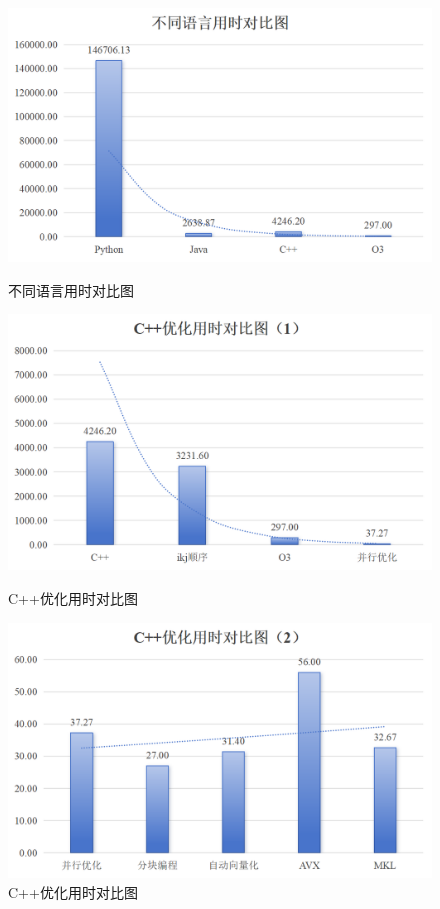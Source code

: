 \documentclass[a4paper, utf8]{ctexart}
\begin{document}
	\begin{figure}
		\begin{minipage}{.32\textwidth}
			\centering
			\includegraphics[height=.11\textheight]{./figure/Experience1_result1.png}
			\caption{不同语言用时对比图}
		\end{minipage}
		\begin{minipage}{.32\textwidth}
			\centering
			\includegraphics[height=.11\textheight]{./figure/Experience1_result2.png}
			\caption{C++优化用时对比图}
		\end{minipage}
		\begin{minipage}{.32\textwidth}
			\centering
			\includegraphics[height=.11\textheight]{./figure/Experience1_result3.png}
			\caption{C++优化用时对比图}
		\end{minipage}
	\end{figure}
	
\end{document}
